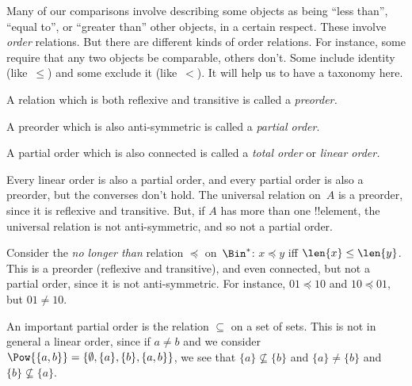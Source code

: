 \documentclass[../../../include/open-logic-section]{subfiles}
\begin{document}

\begin{explain}
Many of our comparisons involve describing some objects as being
``less than'', ``equal to'', or ``greater than'' other objects, in a
certain respect. These involve \emph{order} relations. But there are
different kinds of order relations. For instance, some require that
any two objects be comparable, others don't. Some include identity
(like~$\le$) and some exclude it (like~$<$). It will help us to have a
taxonomy here.
\end{explain}

\begin{defn}[Preorder]
A relation which is both reflexive and transitive is called a
\emph{preorder.}  
\end{defn}

\begin{defn}
A preorder which is also anti-symmetric is called a
\emph{partial order}.
\end{defn}

\begin{defn}
A partial order which is also connected is called a
\emph{total order} or \emph{linear order.}
\end{defn}

\begin{ex}
Every linear order is also a partial order, and every partial order is
also a preorder, but the converses don't hold. The universal relation
on~$A$ is a preorder, since it is reflexive and transitive. But, if
$A$ has more than one !!{element}, the universal relation is not
anti-symmetric, and so not a partial order.
\end{ex}

\begin{ex}
Consider the \emph{no longer than} relation $\preccurlyeq$
on~$\Bin^*$: $x \preccurlyeq y$ iff $\len{x} \le \len{y}$. This is a
preorder (reflexive and transitive), and even connected, but not a
partial order, since it is not anti-symmetric. For instance, $01
\preccurlyeq 10$ and $10 \preccurlyeq 01$, but $01 \neq 10$.
\end{ex}

\begin{ex}
An important partial order is the relation $\subseteq$ on a set of
sets. This is not in general a linear order, since if $a \neq b$ and
we consider $\Pow{\{a, b\}} = \{\emptyset, \{a\}, \{b\}, \{a,b\}\}$,
we see that $\{a\} \nsubseteq \{b\}$ and $\{a\} \neq \{b\}$ and $\{b\}
\nsubseteq \{a\}$.
\end{ex}
\end{document}
